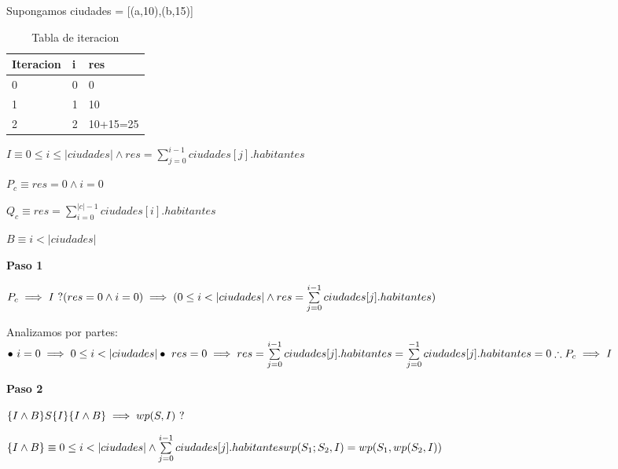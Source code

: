 \documentclass[10pt,a4paper]{article}
\begin{document}
\vspace{0.1cm}

\noindent Supongamos ciudades = [(a,10),(b,15)]

\begin{table}[h!]
	\begin{tabular}{| l | l | l |} 
		\hline
		Iteracion & i & res  \\ [0.5ex] 
		\hline
		0 & 0 & 0 \\ 
		1 & 1 & 10 \\
		2 & 2 & 10+15=25 \\
		\hline
	\end{tabular}
	\captionsetup{singlelinecheck=off}
	\caption{Tabla de iteracion}
	\label{tab:iteracion}
\end{table}

$ I \equiv 0 \leq i \leq |ciudades| \wedge res = \sum\limits_{j=0}^{i-1} ciudades[j].habitantes$

$ P_c \equiv res = 0 \wedge i = 0$

$ Q_c \equiv res = \sum\limits_{i=0}^{|c|-1} ciudades[i].habitantes$

$ B \equiv i < |ciudades|$

\vspace{0.3cm}

\textbf{Paso 1}

\vspace{0.1cm}

\noindent$P_c \implies I \ ? \\ (res = 0 \wedge i = 0) \implies (0 \leq i < |ciudades| \wedge res = \sum\limits_{j=0}^{i-1} ciudades[j].habitantes)$

Analizamos por partes: \\ $\bullet \ i = 0 \implies 0 \leq i < |ciudades| \\ \bullet \ res = 0 \implies res = \sum\limits_{j=0}^{i-1} ciudades[j].habitantes = \sum\limits_{j=0}^{-1} ciudades[j].habitantes = 0 \\ \therefore P_c \implies I$

\vspace{0.3cm}

\textbf{Paso 2}

\vspace{0.1cm}

\noindent$\{I \wedge B\} S \{I\} \\ \{I \wedge B\} \implies wp(S,I) \ ?$

\noindent$ \{I \wedge B\} \equiv 0 \leq i < |ciudades| \wedge \sum\limits_{j=0}^{i-1} ciudades[j].habitantes \\ wp(S_1;S_2,I) = wp(S_1,wp(S_2,I))$
\end{document}
